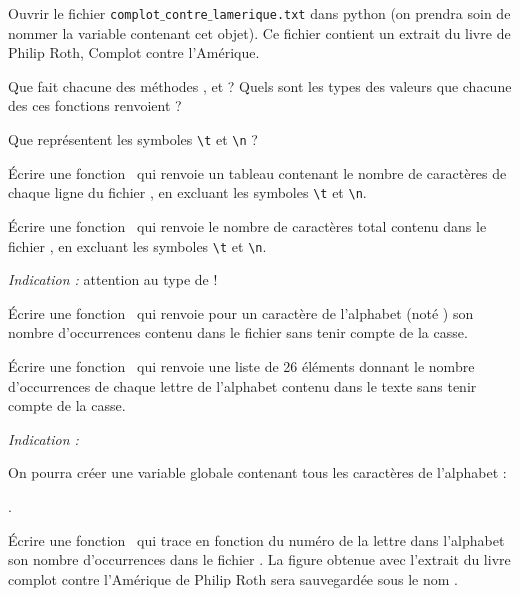 Ouvrir le fichier \texttt{complot$\_$contre$\_$lamerique.txt} dans python (on prendra soin de nommer la variable contenant cet objet). Ce fichier contient un extrait du livre de Philip Roth, Complot contre l'Amérique.

\question{} Que fait chacune des méthodes  ,  et  ? Quels sont les types des valeurs que chacune des ces fonctions renvoient ? 

\question{} Que représentent les symboles \texttt{\textbackslash t} et \texttt{\textbackslash n} ?



\question{} \'Ecrire une fonction \python\,  qui renvoie un tableau contenant le nombre de caractères de chaque ligne du fichier , en excluant les symboles \texttt{\textbackslash t} et \texttt{\textbackslash n}. 

\question{} \'Ecrire une fonction \python\,  qui renvoie le nombre de caractères total contenu dans le fichier  , en excluant les symboles \texttt{\textbackslash t} et \texttt{\textbackslash n}. 

\emph{Indication :} attention au type de  !

\question{} \'Ecrire une fonction \python\,  qui renvoie pour un caractère de l'alphabet (noté ) son nombre d'occurrences contenu dans le fichier  sans tenir compte de la casse.

\question{} \'Ecrire une fonction \python\,  qui renvoie une liste de 26 éléments donnant le nombre d'occurrences de chaque lettre de l'alphabet contenu dans le texte  sans tenir compte de la casse.

\emph{Indication :}  

On pourra créer une variable globale contenant tous les caractères de l'alphabet :

 . 

\question{ } \'Ecrire une fonction \python\,  qui trace en fonction du numéro de la lettre dans l'alphabet son nombre d'occurrences dans le fichier . La figure obtenue avec l'extrait du livre complot contre l'Amérique de Philip Roth sera sauvegardée sous le nom .


